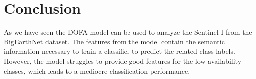 \section{Conclusion}
\label{sec:conclusion}


As we have seen the DOFA model can be used to analyze the Sentinel-I from the BigEarthNet dataset. The features from the model contain the semantic information necessary to train a classifier to predict the related class labels. However, the model struggles to provide good features for the low-availability classes, which leads to a mediocre classification performance.